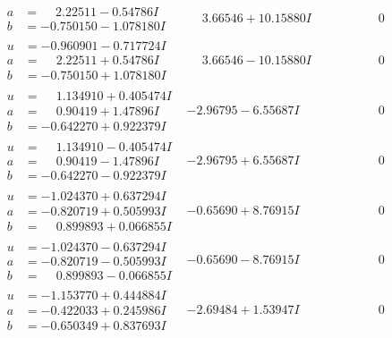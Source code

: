\documentclass[1p]{elsarticle_modified}
\theoremstyle{definition}
\begin{document}
$$\begin{array}{c|c|c}
\begin{aligned}
a &= \phantom{-}2.22511 - 0.54786 I \\
b &= -0.750150 - 1.078180 I\end{aligned}
 & \phantom{-}3.66546 + 10.15880 I & \phantom{-0.000000 } 0 \\ \hline\begin{aligned}
u &= -0.960901 - 0.717724 I \\
a &= \phantom{-}2.22511 + 0.54786 I \\
b &= -0.750150 + 1.078180 I\end{aligned}
 & \phantom{-}3.66546 - 10.15880 I & \phantom{-0.000000 } 0 \\ \hline\begin{aligned}
u &= \phantom{-}1.134910 + 0.405474 I \\
a &= \phantom{-}0.90419 + 1.47896 I \\
b &= -0.642270 + 0.922379 I\end{aligned}
 & -2.96795 - 6.55687 I & \phantom{-0.000000 } 0 \\ \hline\begin{aligned}
u &= \phantom{-}1.134910 - 0.405474 I \\
a &= \phantom{-}0.90419 - 1.47896 I \\
b &= -0.642270 - 0.922379 I\end{aligned}
 & -2.96795 + 6.55687 I & \phantom{-0.000000 } 0 \\ \hline\begin{aligned}
u &= -1.024370 + 0.637294 I \\
a &= -0.820719 + 0.505993 I \\
b &= \phantom{-}0.899893 + 0.066855 I\end{aligned}
 & -0.65690 + 8.76915 I & \phantom{-0.000000 } 0 \\ \hline\begin{aligned}
u &= -1.024370 - 0.637294 I \\
a &= -0.820719 - 0.505993 I \\
b &= \phantom{-}0.899893 - 0.066855 I\end{aligned}
 & -0.65690 - 8.76915 I & \phantom{-0.000000 } 0 \\ \hline\begin{aligned}
u &= -1.153770 + 0.444884 I \\
a &= -0.422033 + 0.245986 I \\
b &= -0.650349 + 0.837693 I\end{aligned}
 & -2.69484 + 1.53947 I & \phantom{-0.000000 } 0 \\ \hline\begin{aligned}

\end{aligned}
\end{array}$$
\end{document}
